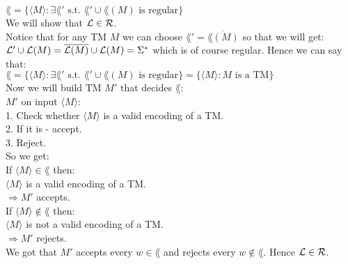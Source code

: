 $\lang = \{\langle M \rangle : \exists \lang' \text { s.t. } \lang' \cup \lang(M) \text{ is regular}\}$ \\

We will show that $\mathcal{L} \in \mathcal{R}$. \\

Notice that for any TM $M$ we can choose $\lang' = \overline{\lang(M)}$ so that we will get: \\
$\mathcal{L}' \cup \mathcal{L}(M) =  \overline{\mathcal{L}(M)} \cup \mathcal{L}(M) = \Sigma^*$ which is of course regular.
Hence we can say that: \\
$\lang = \{\langle M \rangle : \exists \lang' \text { s.t. } \lang' \cup \lang(M) \text{ is regular}\}
    = \{\langle M \rangle : M \text{ is a TM}\}$ \\

Now we will build TM $M'$ that decides $\lang$: \\
$M'$ on input $\langle M \rangle$: \\
1. Check whether $\langle M \rangle$ is a valid encoding of a TM. \\
2. If it is - accept. \\
3. Reject. \\

So we get: \\
If $\langle M \rangle \in \lang$ then: \\
$\langle M \rangle$ is a valid encoding of a TM. \\
$\Rightarrow M'$ accepts. \\

If $\langle M \rangle \notin \lang$ then: \\
$\langle M \rangle$ is not a valid encoding of a TM. \\
$\Rightarrow M'$ rejects. \\

We got that $M'$ accepts every $w \in \lang$ and rejects every $w \notin \lang$. Hence $\mathcal{L} \in \mathcal{R}$. \\
